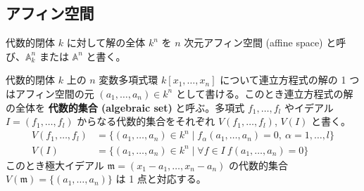 \documentclass[uplatex,dvipdfmx,a4paper,11pt]{jlreq}
\renewcommand{\AA}{\mathbb{A}}
\newcommand{\mm}{\mathfrak{m}}
\numberwithin{equation}{section}
\theoremstyle{definition}
\begin{document}
\subsection{アフィン空間}
\begin{definition}[アフィン空間]
  代数的閉体 $k$ に対して解の全体 $k^n$ を $n$ 次元アフィン空間 (affine space) と呼び、$\AA_k^n$ または $\AA^n$ と書く。
\end{definition}
代数的閉体 $k$ 上の $n$ 変数多項式環 $k[x_1,\ldots,x_n]$ について連立方程式の解の 1 つはアフィン空間の元 $(a_1,\ldots,a_n)\in k^n$ として書ける。このとき連立方程式の解の全体を \textbf{代数的集合 (algebraic set)} と呼ぶ。多項式 $f_1,\ldots,f_l$ やイデアル $I = (f_1,\ldots,f_l)$ からなる代数的集合をそれぞれ $V(f_1,\ldots,f_l)$, $V(I)$ と書く。
\begin{align}
  V(f_1, \ldots, f_l) & = \lbrace(a_1, \ldots, a_n)\in k^n\mid f_\alpha(a_1,\ldots,a_n) = 0,\ \alpha = 1,\ldots,l\rbrace \\
  V(I)                & = \lbrace(a_1, \ldots, a_n)\in k^n\mid \forall f\in I \ f(a_1,\ldots,a_n) = 0\rbrace
\end{align}
このとき極大イデアル $\mm = (x_1 - a_1,\ldots,x_n - a_n)$ の代数的集合 $V(\mm) = \lbrace(a_1,\ldots,a_n)\rbrace$ は 1 点と対応する。
\end{document}
